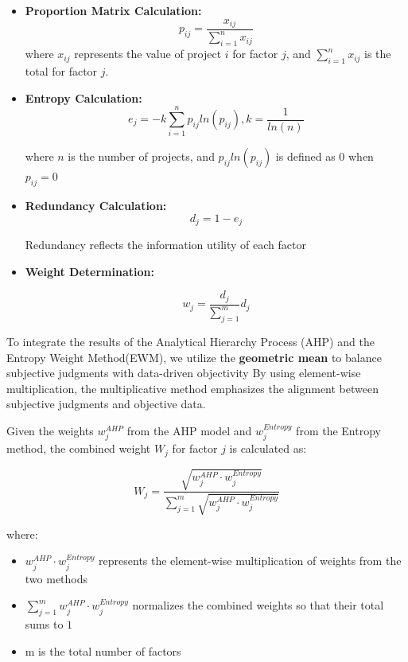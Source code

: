 \documentclass[12pt]{article}
\begin{document}
\begin{itemize}
   \item \textbf{Proportion Matrix Calculation:} 
\[
    p_{ij} = \frac{x_{ij}}{\sum_{i=1}^{n} x_{ij}}
\]
where \(x_{ij}\) represents the value of project \(i\) for factor \(j\), and \(\sum_{i=1}^{n} x_{ij}\) is the total for factor \(j\).

    \item \textbf{Entropy Calculation:}
\[
e_{j}=-k\sum_{i=1}^{n} p_{ij}ln(p_{ij}) , k = \frac{1}{ln(n)}
\]

where \(n\) is the number of projects, and \(p_{ij}ln(p_{ij})\) is defined as 0 when \(p_{ij}=0\)

    \item \textbf{Redundancy Calculation:}
\[
d_{j}=1-e_{j}
\]

Redundancy reflects the information utility of each factor

    \item \textbf{Weight Determination:}

\[
w_{j}=\frac{d_{j}}{\sum_{j=1}^{m}}d_{j}
\]
\end{itemize}

To integrate the results of the Analytical Hierarchy Process (AHP) and the Entropy Weight Method(EWM), we utilize the \textbf{geometric mean} to balance subjective judgments with data-driven objectivity By using element-wise multiplication, the multiplicative method emphasizes the alignment between subjective judgments and objective data.

Given the weights \(w_{j}^{AHP}\) from the AHP model and \(w_{j}^{Entropy}\) from the Entropy method, the combined weight \(W_{j}\) for factor \(j\) is calculated as: 

\[
W_{j}=\frac{
\sqrt{w_{j}^{AHP}\cdot w_{j}^{Entropy}}
}
{
\sum_{j=1}^{m}\sqrt{w_{j}^{AHP}\cdot w_{j}^{Entropy}}
}
\]

where: 

\begin{itemize}
    \item \(w_{j}^{AHP}\cdot w_{j}^{Entropy}\) represents the element-wise multiplication of weights from the two methods

    \item \(\sum_{j=1}^{m}w_{j}^{AHP}\cdot w_{j}^{Entropy}\) normalizes the combined weights so that their total sums to \(1\)
    
    \item m is the total number of factors
\end{itemize}
\end{document}
